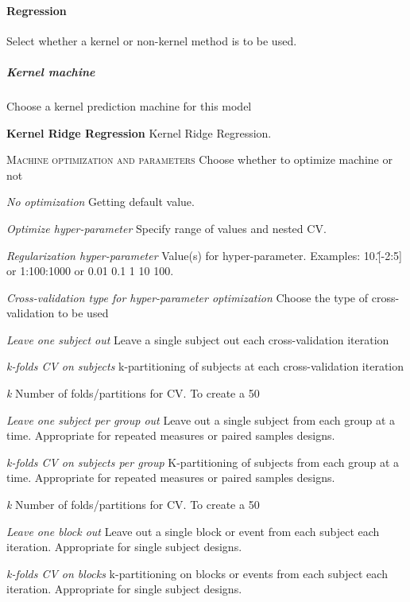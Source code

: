 \paragraph{Regression }
Select whether a kernel or non-kernel method is to be used.


\subparagraph{Kernel machine}
Choose a kernel prediction machine for this model


\textbf{Kernel Ridge Regression}
Kernel Ridge Regression.


\textsc{Machine optimization and parameters}
Choose whether to optimize machine or not


\textsl{No optimization}
Getting default value.


\textsl{Optimize hyper-parameter}
Specify range of values and nested CV.


\textit{Regularization hyper-parameter}
Value(s) for hyper-parameter. Examples: 10.\^[-2:5] or 1:100:1000 or 0.01 0.1 1 10 100.


\textit{Cross-validation type for hyper-parameter optimization}
Choose the type of cross-validation to be used


\textit{Leave one subject out}
Leave a single subject out each cross-validation iteration


\textit{k-folds CV on subjects}
k-partitioning of subjects at each cross-validation iteration


\textit{k}
Number of folds/partitions for CV. To create a 50%


\textit{Leave one subject per group out}
Leave out a single subject from each group at a time. Appropriate for repeated measures or paired samples designs.


\textit{k-folds CV on subjects per group}
K-partitioning of subjects from each group at a time. Appropriate for repeated measures or paired samples designs.


\textit{k}
Number of folds/partitions for CV. To create a 50%


\textit{Leave one block out}
Leave out a single block or event from each subject each iteration. Appropriate for single subject designs.


\textit{k-folds CV on blocks}
k-partitioning on blocks or events from each subject each iteration. Appropriate for single subject designs.


